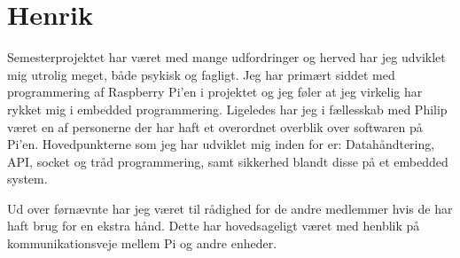 \section{Henrik}

Semesterprojektet har været med mange udfordringer og herved har jeg udviklet mig utrolig meget, både psykisk og fagligt.
Jeg har primært siddet med programmering af Raspberry Pi'en i projektet og jeg føler at jeg virkelig har rykket mig i embedded programmering.
Ligeledes har jeg i fællesskab med Philip været en af personerne der har haft et overordnet overblik over softwaren på Pi'en.
Hovedpunkterne som jeg har udviklet mig inden for er: Datahåndtering, API, socket og tråd programmering, samt sikkerhed blandt disse på et embedded system.

Ud over førnævnte har jeg været til rådighed for de andre medlemmer hvis de har haft brug for en ekstra hånd. Dette har hovedsageligt været med henblik på kommunikationsveje mellem Pi og andre enheder.